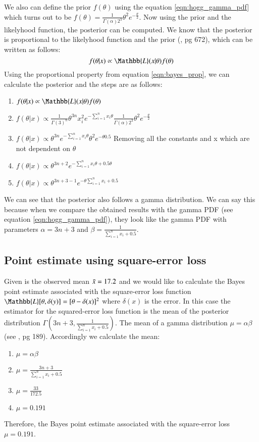 We also can define the prior $f(\theta)$ using the equation \ref{eqn:hogg_gamma_pdf} which turns out to be $f(\theta) = \frac{1}{\Gamma(\alpha)2^3}\theta^2 e^{-\frac{\theta}{2}}$. Now using the prior and the likelyhood function, the posterior can be computed. We know that the posterior  is proportional to the likelyhood function and the prior (\cite{hogg:2005}, pg 672), which can be written as follows:
\begin{equation} \label{eqn:bayes_prop}
    f(\theta|x) \propto \Mathbb{L}(x|\theta) f(\theta)
\end{equation}
Using the proportional property from equation \ref{eqn:bayes_prop}, we can calculate the posterior and the steps are as follows:
\begin{enumerate}
    \item $f(\theta|x) \propto \Mathbb{L}(x|\theta)f(\theta)$
    \item $f(\theta|x) \propto \frac{1}{\Gamma(3)^n} \theta^{3n} x_i^{2} e^{-\sum_{i=1}^{n}x_i\theta} \frac{1}{\Gamma(\alpha)2^3}\theta^2 e^{-\frac{\theta}{2}}$
    \item $f(\theta|x) \propto  \theta^{3n} e^{-\sum_{i=1}^{n}x_i\theta} \theta^2 e^{-\theta0.5}$ Removing all the constants and x which are not dependent on $\theta$
     \item $f(\theta|x) \propto  \theta^{3n+2} e^{-\sum_{i=1}^{n}x_i\theta +0.5\theta}$ 
    \item $f(\theta|x) \propto  \theta^{3n+3-1} e^{-\theta \sum_{i=1}^{n}x_i +0.5}$  
\end{enumerate}
We can see that the posterior also follows a gamma distribution. We can say this because when we compare the obtained results with the gamma PDF (see equation \ref{eqn:hogg_gamma_pdf}), they look like the gamma PDF with parameters $\alpha=3n+3$ and $\beta=\frac{1}{\sum_{i=1}^{n}x_i +0.5}$. 

\subsection{Point estimate using square-error loss}
Given is the observed mean $\Bar{x} = 17.2$ and we would like to calculate the Bayes point estimate associated with the square-error loss function $\Mathbb{L}[\theta, \delta(y)] = [\theta - \delta(x)]^2$ where $\delta(x)$ is the error. In this case the estimator for the squared-error loss function is the mean of the posterior distribution $\Gamma(3n+3, \frac{1}{\sum_{i=1}^{n}x_i +0.5})$. The mean of a gamma distribution $\mu = \alpha\beta$ (see \cite{hogg:2005}, pg 189). Accordingly we calculate the mean:
\begin{enumerate}
    \item $\mu = \alpha\beta$
    \item $\mu = \frac{3n+3}{\sum_{i=1}^{n}x_i +0.5}$
    \item $ \mu = \frac{33}{172.5}$
    \item $ \mu = 0.191$
\end{enumerate}
Therefore, the Bayes point estimate associated with the square-error loss $\mu = 0.191$.
